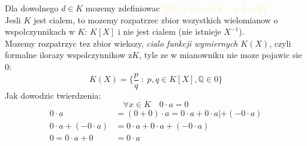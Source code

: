 \documentclass{article}
\newcommand{\Q}{\mathbb{Q}}
\begin{document}
  Dla dowolnego $d\in K$ mozemy zdefiniowac $\color{acc}\Q[d]=\{a+b\cdot d\;:\;a,b\in\Q\}$\medskip\\
  Jesli $K$ jest cialem, to mozemy rozpatrzec zbior wszystkich wielomianow o wspolczynnikach w $K$: $K[X]$ i nie jest cialem (nie istnieje $X^{-1}$).\smallskip\\
  Mozemy rozpatrzyc tez zbior wiekszy, \color{def}\emph{cialo funkcji wymiernych} $K(X)$\color{txt}, czyli formalne ilorazy wspolczynnikow z$K$, tyle ze w mianowniku nie moze pojawic sie 0:
  $$K(X)=\{\frac{p}{q}\;:\;p,q\in K[X], \Q\in 0\}$$
  Jak dowodzic twierdzenia:
  $$\forall x\in K\quad 0\cdot a= 0$$
  \begin{align*}
    0\cdot a &= (0+0)\cdot a = 0\cdot a + 0\cdot a | + (- 0\cdot a)\\
    0\cdot a + (-0\cdot a) &= 0\cdot a + 0\cdot a+(-0\cdot a)\\
    0 = 0\cdot a + 0 &= 0\cdot a
  \end{align*}
\end{document}
